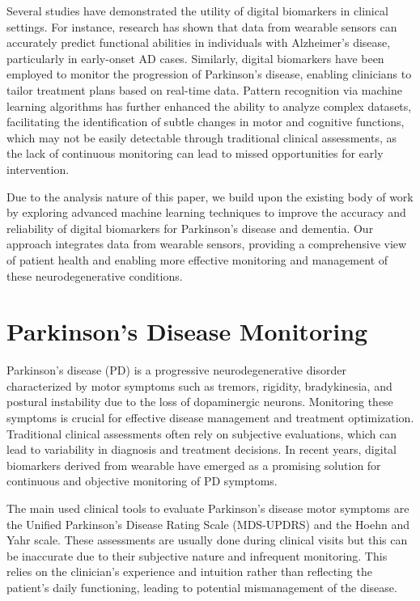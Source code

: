 \documentclass[sigconf,nonacm]{acmart}
\begin{document}
    Several studies have demonstrated the utility of digital biomarkers in clinical settings. For instance, research has shown that data from wearable sensors can accurately predict functional abilities in individuals with Alzheimer's disease, particularly in early-onset AD cases. Similarly, digital biomarkers have been employed to monitor the progression of Parkinson's disease, enabling clinicians to tailor treatment plans based on real-time data. Pattern recognition via machine learning algorithms has further enhanced the ability to analyze complex datasets, facilitating the identification of subtle changes in motor and cognitive functions, which may not be easily detectable through traditional clinical assessments, as the lack of continuous monitoring can lead to missed opportunities for early intervention.

    Due to the analysis nature of this paper, we build upon the existing body of work by exploring advanced machine learning techniques to improve the accuracy and reliability of digital biomarkers for Parkinson's disease and dementia. Our approach integrates data from wearable sensors, providing a comprehensive view of patient health and enabling more effective monitoring and management of these neurodegenerative conditions.

\section{Parkinson's Disease Monitoring}

    Parkinson's disease (PD) is a progressive neurodegenerative disorder characterized by motor symptoms such as tremors, rigidity, bradykinesia, and postural instability due to the loss of dopaminergic neurons. Monitoring these symptoms is crucial for effective disease management and treatment optimization. Traditional clinical assessments often rely on subjective evaluations, which can lead to variability in diagnosis and treatment decisions. In recent years, digital biomarkers derived from wearable have emerged as a promising solution for continuous and objective monitoring of PD symptoms.

    The main used clinical tools to evaluate Parkinson's disease motor symptoms are the Unified Parkinson's Disease Rating Scale (MDS-UPDRS) and the Hoehn and Yahr scale. These assessments are usually done during clinical visits but this can be inaccurate due to their subjective nature and infrequent monitoring.  This relies on the clinician’s experience and intuition rather than reflecting the patient’s daily functioning, leading to potential mismanagement of the disease.
\end{document}
